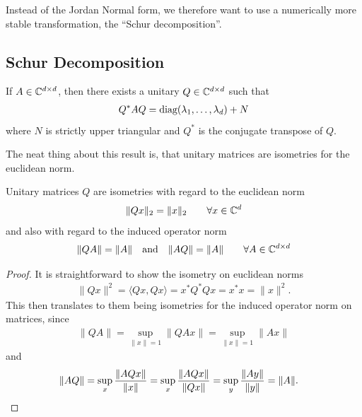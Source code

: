 Instead of the Jordan Normal form, we therefore want to use a numerically more
stable transformation, the ``Schur decomposition''.

\subsection{Schur Decomposition}

\begin{theorem}
	If \(A\in\mathbb{C}^{d\times d}\), then there exists a unitary
	\(Q\in\mathbb{C}^{d\times d}\) such that
	\begin{align*}
		Q^* A Q = \text{diag}(\lambda_1, \dots, \lambda_d) + N
	\end{align*}
	where \(N\) is strictly upper triangular and \(Q^*\) is the conjugate
	transpose of \(Q\).
\end{theorem}

The neat thing about this result is, that unitary matrices are isometries for the
euclidean norm.

\begin{lemma}
	\label{lem: unitary matrices are isometries}
	Unitary matrices \(Q\) are isometries with regard to the euclidean norm
	\begin{align*}
		\|Qx\|_2 = \|x\|_2 \qquad \forall x\in\mathbb{C}^d
	\end{align*}	
	and also with regard to the induced operator norm
	\begin{align*}
		\|QA\| = \|A\| \quad \text{and} \quad \|AQ\| = \|A\|
		\qquad \forall A \in\mathbb{C}^{d\times d}
	\end{align*}
\end{lemma}
\begin{proof}
	It is straightforward to show the isometry on euclidean norms
	\begin{align*}
		\|Qx\|^2 = \langle Qx, Qx\rangle = x^* Q^* Q x = x^* x = \|x\|^2.
	\end{align*}
	This then translates to them being isometries for the induced operator norm
	on matrices, since
	\begin{align*}
		\|QA\| = \sup_{\|x\|=1} \|QAx\| = \sup_{\|x\|=1} \|Ax\|
	\end{align*}
	and
	\begin{align*}
		\|AQ\|
		&= \sup_{x} \frac{\|AQx\|}{\|x\|} = \sup_{x} \frac{\|AQx\|}{\|Qx\|}
		= \sup_{y} \frac{\|Ay\|}{\|y\|} = \|A\|.
		\qedhere
	\end{align*}
\end{proof}


